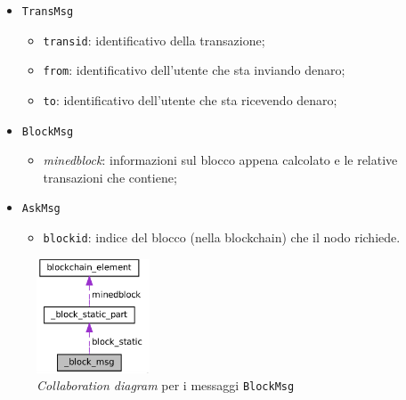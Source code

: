 \begin{itemize}
    \item \texttt{TransMsg}
    \begin{itemize}
        \item \texttt{transid}: identificativo della transazione;
        \item \texttt{from}: identificativo dell'utente che sta inviando denaro;
        \item \texttt{to}: identificativo dell'utente che sta ricevendo denaro;
    \end{itemize}
    \item \texttt{BlockMsg}
        \begin{itemize}
            \item \textit{minedblock}: informazioni sul blocco appena calcolato e le relative transazioni che contiene;
        \end{itemize}
    \item \texttt{AskMsg}
        \begin{itemize}
            \item \texttt{blockid}: indice del blocco (nella blockchain) che il nodo richiede.
        \end{itemize}
\end{itemize}
\begin{figure}[H]
    \centering
    \includegraphics[width=0.3\textwidth]{images/collaboration_block.png}
    \caption{\textit{Collaboration diagram} per i messaggi \texttt{BlockMsg}}
\end{figure}
\clearpage

